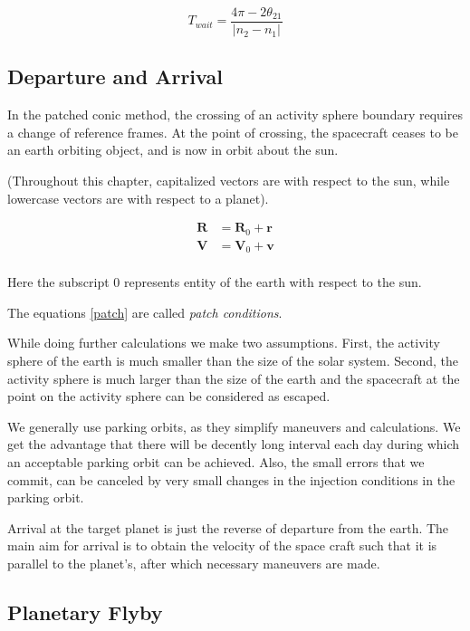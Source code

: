 \documentclass{article}
\theoremstyle{definition}
\begin{document}
\begin{equation}
    T_{wait} = \frac{4\pi - 2\theta_{21}}{|n_2 - n_1|}
\end{equation}

\subsection{Departure and Arrival}

In the patched conic method, the crossing of an activity sphere boundary requires a change of reference frames.
At the point of crossing, the spacecraft ceases to be an earth orbiting object, and is now in orbit about the sun.

(Throughout this chapter, capitalized vectors are with respect to the sun, while lowercase vectors are with respect to a planet).

\begin{equation}\label{patch}
\begin{split}
    \boldsymbol{R} & = \boldsymbol{R}_0 + \boldsymbol{r}\\
    \boldsymbol{V} & = \boldsymbol{V}_0 + \boldsymbol{v}\\
\end{split}
\end{equation}

Here the subscript $0$ represents entity of the earth with respect to the sun.

The equations \ref{patch} are called \emph{patch conditions}.

While doing further calculations we make two assumptions. 
First, the activity sphere of the earth is much smaller than the size of the solar system.
Second, the activity sphere is much larger than the size of the earth and the spacecraft at the point on the activity sphere can be considered as escaped.

We generally use parking orbits, as they simplify maneuvers and calculations.
We get the advantage that there will be decently long interval each day during which an acceptable parking orbit can be achieved.
Also, the small errors that we commit, can be canceled by very small changes in the injection conditions in the parking orbit.

Arrival at the target planet is just the reverse of departure from the earth.
The main aim for arrival is to obtain the velocity of the space craft such that it is parallel to the planet's, after which necessary maneuvers are made.

\subsection{Planetary Flyby}
\end{document}
